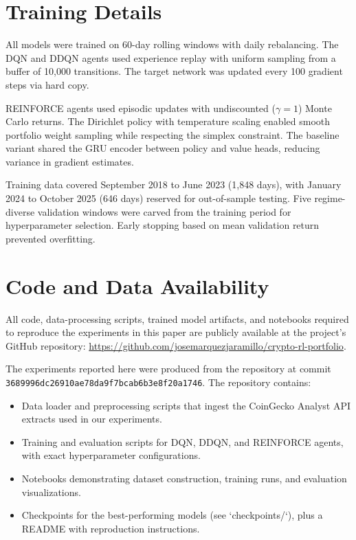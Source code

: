 
\section{Training Details}
\label{app:training_details}

All models were trained on 60-day rolling windows with daily rebalancing. The DQN and DDQN agents used experience replay with uniform sampling from a buffer of 10,000 transitions. The target network was updated every 100 gradient steps via hard copy.

REINFORCE agents used episodic updates with undiscounted ($\gamma = 1$) Monte Carlo returns. The Dirichlet policy with temperature scaling enabled smooth portfolio weight sampling while respecting the simplex constraint. The baseline variant shared the GRU encoder between policy and value heads, reducing variance in gradient estimates.

Training data covered September 2018 to June 2023 (1,848 days), with January 2024 to October 2025 (646 days) reserved for out-of-sample testing. Five regime-diverse validation windows were carved from the training period for hyperparameter selection. Early stopping based on mean validation return prevented overfitting.

\section{Code and Data Availability}
\label{app:code_availability}

All code, data-processing scripts, trained model artifacts, and notebooks required to reproduce the experiments in this paper are publicly available at the project's GitHub repository: \url{https://github.com/josemarquezjaramillo/crypto-rl-portfolio}.

The experiments reported here were produced from the repository at commit \texttt{3689996dc26910ae78da9f7bcab6b3e8f20a1746}. The repository contains:
\begin{itemize}
  \item Data loader and preprocessing scripts that ingest the CoinGecko Analyst API extracts used in our experiments.
  \item Training and evaluation scripts for DQN, DDQN, and REINFORCE agents, with exact hyperparameter configurations.
  \item Notebooks demonstrating dataset construction, training runs, and evaluation visualizations.
  \item Checkpoints for the best-performing models (see `checkpoints/`), plus a README with reproduction instructions.
\end{itemize}

